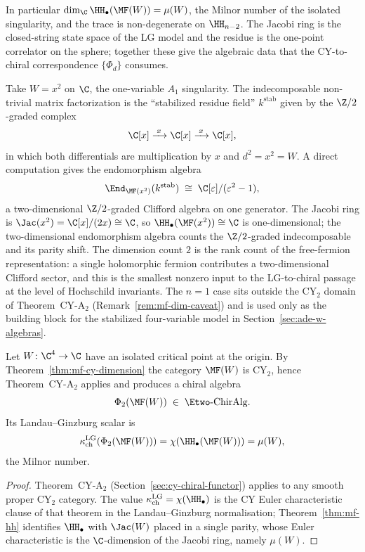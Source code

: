 In particular $\dim_{\C} \HH_{\bullet}(\MF(W)) = \mu(W)$, the Milnor number of the isolated singularity, and the trace is non-degenerate on $\HH_{n-2}$. The Jacobi ring is the closed-string state space of the LG model and the residue is the one-point correlator on the sphere; together these give the algebraic data that the CY-to-chiral correspondence $\{\Phi_d\}$ consumes.

\begin{example}
\label{ex:mf-quadratic}
Take $W = x^2$ on $\C$, the one-variable $A_1$ singularity. The indecomposable non-trivial matrix factorization is the ``stabilized residue field'' $k^{\mathrm{stab}}$ given by the $\Z/2$-graded complex
\[
 \C[x] \xrightarrow{\; x \;} \C[x] \xrightarrow{\; x \;} \C[x],
\]
in which both differentials are multiplication by $x$ and $d^2 = x^2 = W$. A direct computation gives the endomorphism algebra
\[
 \End_{\MF(x^2)}(k^{\mathrm{stab}}) \;\cong\; \C[\varepsilon]/(\varepsilon^2 - 1),
\]
a two-dimensional $\Z/2$-graded Clifford algebra on one generator. The Jacobi ring is $\Jac(x^2) = \C[x]/(2x) \cong \C$, so $\HH_\bullet(\MF(x^2)) \cong \C$ is one-dimensional; the two-dimensional endomorphism algebra counts the $\Z/2$-graded indecomposable and its parity shift. The dimension count $2$ is the rank count of the free-fermion representation: a single holomorphic fermion contributes a two-dimensional Clifford sector, and this is the smallest nonzero input to the LG-to-chiral passage at the level of Hochschild invariants. The $n = 1$ case sits outside the CY$_2$ domain of Theorem~CY-A$_2$ (Remark~\ref{rem:mf-dim-caveat}) and is used only as the building block for the stabilized four-variable model in Section~\ref{sec:ade-w-algebras}.
\end{example}

\begin{proposition}[\texorpdfstring{$\Phi_2(\MF(W))$}{Phi-2(MF(W))} for \texorpdfstring{$n = 4$}{n = 4}]
\label{prop:mf-phi-input}
Let $W \colon \C^4 \to \C$ have an isolated critical point at the origin. By Theorem~\ref{thm:mf-cy-dimension} the category $\MF(W)$ is CY$_2$, hence Theorem~CY-A$_2$ applies and produces a chiral algebra
\[
 \Phi_2(\MF(W)) \;\in\; \Etwo\text{-}\mathrm{ChirAlg} .
\]
Its Landau--Ginzburg scalar is
\[
 \kappa_{\mathrm{ch}}^{\mathrm{LG}}(\Phi_2(\MF(W))) =
 \chi(\HH_\bullet(\MF(W))) = \mu(W),
\]
the Milnor number.
\end{proposition}

\begin{proof}
Theorem~CY-A$_2$ (Section~\ref{sec:cy-chiral-functor}) applies to any smooth proper CY$_2$ category. The value $\kappa_{\mathrm{ch}}^{\mathrm{LG}} = \chi(\HH_\bullet)$ is the CY Euler characteristic clause of that theorem in the Landau--Ginzburg normalisation; Theorem~\ref{thm:mf-hh} identifies $\HH_\bullet$ with $\Jac(W)$ placed in a single parity, whose Euler characteristic is the $\C$-dimension of the Jacobi ring, namely $\mu(W)$.
\end{proof}

